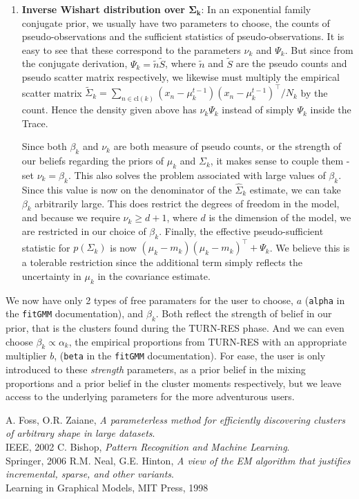 \documentclass[11pt]{article}
\def\bs{\boldsymbol}
\def\Tr{^\top}
\begin{document}
\begin{enumerate}
\item \textbf{Inverse Wishart distribution over $\bs{\Sigma_k}$}: In an exponential family conjugate prior, we usually have two parameters to choose, the counts of pseudo-observations and the sufficient statistics of pseudo-observations. It is easy to see that these correspond to the parameters $\nu_k$ and $\Psi_k$. But since from the conjugate derivation, $\Psi_k = \tilde{n}\tilde{S}$, where $\tilde{n}$ and $\tilde{S}$ are the pseudo counts and pseudo scatter matrix respectively, we likewise must multiply the empirical scatter matrix $\tilde{\Sigma}_k = \sum_{n \in \text{cl}(k)} (x_n - \mu_k^{t-1})(x_n - \mu_k^{t-1})\Tr /N_k$ by the count. Hence the density given above has $\nu_k\Psi_k$ instead of simply $\Psi_k$ inside the Trace.\par
Since both $\beta_k$ and $\nu_k$ are both measure of pseudo counts, or the strength of our beliefs regarding the priors of $\mu_k$ and $\Sigma_k$, it makes sense to couple them - set $\nu_k = \beta_k$. This also solves the problem associated with large values of $\beta_k$. Since this value is now on the denominator of the $\hat\Sigma_k$ estimate, we can take $\beta_k$ arbitrarily large. This does restrict the degrees of freedom in the model, and because we require $\nu_k \ge d+1$, where $d$ is the dimension of the model, we are restricted in our choice of $\beta_k$. Finally, the effective pseudo-sufficient statistic for $p(\Sigma_k)$ is now $(\mu_k - m_k)(\mu_k - m_k)\Tr + \Psi_k$. We believe this is a tolerable restriction since the additional term simply reflects the uncertainty in $\mu_k$ in the covariance estimate.
\end{enumerate}
We now have only 2 types of free paramaters for the user to choose, $a$ (\texttt{alpha} in the \texttt{fitGMM} documentation), and $\beta_k$. Both reflect the strength of belief in our prior, that is the clusters found during the TURN-RES phase. And we can even choose $\beta_k \propto \alpha_k$, the empirical proportions from TURN-RES with an appropriate multiplier $b$, (\texttt{beta} in the \texttt{fitGMM} documentation). For ease, the user is only introduced to these \emph{strength} parameters, as a prior belief in the mixing proportions and a prior belief in the cluster moments respectively, but we leave access to the underlying parameters for the more adventurous users.
\vspace{20pt}

\begin{thebibliography}{1}
{A. Foss, O.R. Zaiane,
\emph{A parameterless method for efficiently discovering clusters of arbitrary shape in large datasets}.\\
IEEE, 2002}
 {C. Bishop,
  \emph{Pattern Recognition and Machine Learning}.\\
  Springer, 2006}
 {R.M. Neal, G.E. Hinton,
  \emph{A view of the EM algorithm that justifies incremental, sparse, and other variants}.\\
  Learning in Graphical Models, MIT Press, 1998}
\end{thebibliography}
\end{document}
